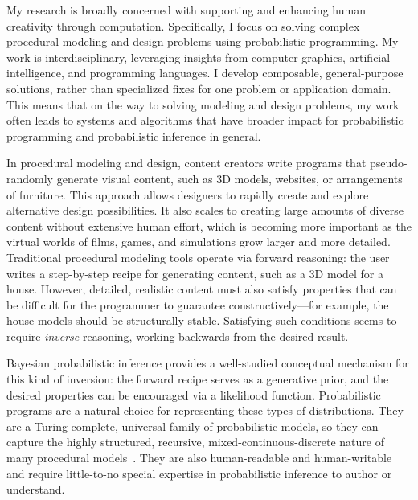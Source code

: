 \documentclass[
10pt, %
a4paper, %
oneside, %
headinclude,footinclude, %
BCOR5mm, %
]{scrartcl}
\title{\normalfont\spacedallcaps{Daniel Ritchie}} %
\author{\spacedallcaps{Research Statement}} %
\date{} %
\begin{document}

\pagestyle{scrheadings}
\clearscrheadings
\newcommand{\headertext}{\spacedlowsmallcaps{\color{black} Daniel Ritchie \color{halfgray} Research Statement}}
\ohead{\headertext}
\cfoot[\pagemark]{\pagemark}


\maketitle

My research is broadly concerned with supporting and enhancing human creativity through computation.
Specifically, I focus on solving complex procedural modeling and design problems using probabilistic programming. My work is interdisciplinary, leveraging insights from computer graphics, artificial intelligence, and programming languages. I develop composable, general-purpose solutions, rather than specialized fixes for one problem or application domain. This means that on the way to solving modeling and design problems, my work often leads to systems and algorithms that have broader impact for probabilistic programming and probabilistic inference in general.

In procedural modeling and design, content creators write programs that pseudo-randomly generate visual content, such as 3D models, websites, or arrangements of furniture. This approach allows designers to rapidly create and explore alternative design possibilities. It also scales to creating large amounts of diverse content without extensive human effort, which is becoming more important as the virtual worlds of films, games, and simulations grow larger and more detailed. Traditional procedural modeling tools operate via forward reasoning: the user writes a step-by-step recipe for generating content, such as a 3D model for a house. However, detailed, realistic content must also satisfy properties that can be difficult for the programmer to guarantee constructively---for example, the house models should be structurally stable. Satisfying such conditions seems to require \emph{inverse} reasoning, working backwards from the desired result.

Bayesian probabilistic inference provides a well-studied conceptual mechanism for this kind of inversion: the forward recipe serves as a generative prior, and the desired properties can be encouraged via a likelihood function. Probabilistic programs are a natural choice for representing these types of distributions. They are a Turing-complete, universal family of probabilistic models, so they can capture the highly structured, recursive, mixed-continuous-discrete nature of many procedural models~\cite{Church}. They are also human-readable and human-writable and require little-to-no special expertise in probabilistic inference to author or understand.
\end{document}
